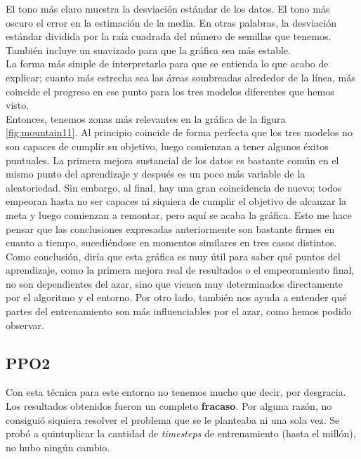 \documentclass[11pt,fleqn]{book} %
\begin{document}
El tono más claro muestra la desviación estándar de los datos. El tono más oscuro el error en la estimación de la media. En otras palabras, la desviación estándar dividida por la raíz cuadrada del número de semillas que tenemos. También incluye un suavizado para que la gráfica sea más estable. \\

La forma más simple de interpretarlo para que se entienda lo que acabo de explicar; cuanto más estrecha sea las áreas sombreadas alrededor de la línea, más coincide el progreso en ese punto para los tres modelos diferentes que hemos visto. \\

Entonces, tenemos zonas más relevantes en la gráfica de la figura \ref{fig:mountain11}. Al principio coincide de forma perfecta que los tres modelos no son capaces de cumplir su objetivo, luego comienzan a tener algunos éxitos puntuales. La primera mejora sustancial de los datos es bastante común en el mismo punto del aprendizaje y después es un poco más variable de la aleatoriedad. Sin embargo, al final, hay una gran coincidencia de nuevo; todos empeoran hasta no ser capaces ni siquiera de cumplir el objetivo de alcanzar la meta y luego comienzan a remontar, pero aquí se acaba la gráfica. Esto me hace pensar que las conclusiones expresadas anteriormente son bastante firmes en cuanto a tiempo, sucediéndose en momentos similares en tres casos distintos.\\

Como conclusión, diría que esta gráfica es muy útil para saber qué puntos del aprendizaje, como la primera mejora real de resultados o el empeoramiento final, no son dependientes del azar, sino que vienen muy determinados directamente por el algoritmo y el entorno. Por otro lado, también nos ayuda a entender qué partes del entrenamiento son más influenciables por el azar, como hemos podido observar.

\subsection{PPO2}\label{sec:mountain:PPO2}

Con esta técnica para este entorno no tenemos mucho que decir, por desgracia. Los resultados obtenidos fueron un completo \textbf{fracaso}. Por alguna razón, no consiguió siquiera resolver el problema que se le planteaba ni una sola vez. Se probó a quintuplicar la cantidad de \textit{timesteps} de entrenamiento (hasta el millón), no hubo ningún cambio.
\end{document}
